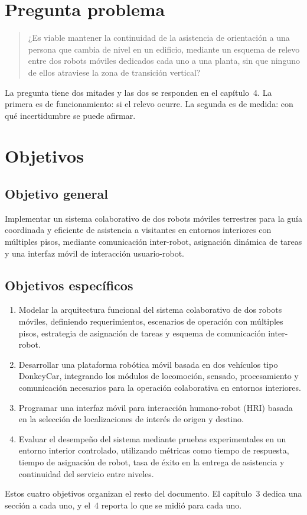 \section{Pregunta problema}

\begin{quote}
¿Es viable mantener la continuidad de la asistencia de orientación a una persona
que cambia de nivel en un edificio, mediante un esquema de relevo entre dos
robots móviles dedicados cada uno a una planta, sin que ninguno de ellos
atraviese la zona de transición vertical?
\end{quote}

La pregunta tiene dos mitades y las dos se responden en el capítulo~4. La primera
es de funcionamiento: si el relevo ocurre. La segunda es de medida: con qué
incertidumbre se puede afirmar.

\section{Objetivos}

\subsection{Objetivo general}

Implementar un sistema colaborativo de dos robots móviles terrestres para la guía
coordinada y eficiente de asistencia a visitantes en entornos interiores con
múltiples pisos, mediante comunicación inter-robot, asignación dinámica de tareas
y una interfaz móvil de interacción usuario-robot.

\subsection{Objetivos específicos}

\begin{enumerate}[leftmargin=*,label=\textbf{OE\arabic*.}]
  \item Modelar la arquitectura funcional del sistema colaborativo de dos robots
    móviles, definiendo requerimientos, escenarios de operación con múltiples
    pisos, estrategia de asignación de tareas y esquema de comunicación
    inter-robot.
  \item Desarrollar una plataforma robótica móvil basada en dos vehículos tipo
    DonkeyCar, integrando los módulos de locomoción, sensado, procesamiento y
    comunicación necesarios para la operación colaborativa en entornos
    interiores.
  \item Programar una interfaz móvil para interacción humano-robot (HRI) basada
    en la selección de localizaciones de interés de origen y destino.
  \item Evaluar el desempeño del sistema mediante pruebas experimentales en un
    entorno interior controlado, utilizando métricas como tiempo de respuesta,
    tiempo de asignación de robot, tasa de éxito en la entrega de asistencia y
    continuidad del servicio entre niveles.
\end{enumerate}

Estos cuatro objetivos organizan el resto del documento. El capítulo~3 dedica una
sección a cada uno, y el~4 reporta lo que se midió para cada uno.
